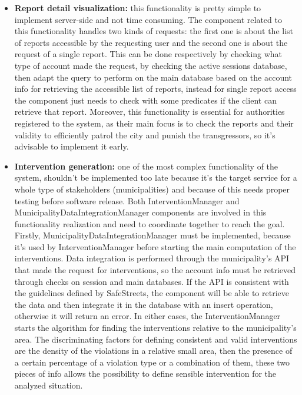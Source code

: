 \begin{itemize}
	\item \textbf{Report detail visualization:} this functionality is pretty simple to implement server-side and not time consuming. The component related to this functionality handles two kinds of requests: the first one is about the list of reports accessible by the requesting user and the second one is about the request of a single report. This can be done respectively by checking what type of account made the request, by checking the active sessions database, then adapt the query to perform on the main database based on the account info for retrieving the accessible list of reports, instead for single report access the component just needs to check with some predicates if the client can retrieve that report. Moreover, this functionality is essential for authorities registered to the system, as their main focus is to check the reports and their validity to efficiently patrol the city and punish the transgressors, so it's advisable to implement it early.
	
	\item \textbf{Intervention generation:} one of the most complex functionality of the system, shouldn't be implemented too late because it's the target service for a whole type of stakeholders (municipalities) and because of this needs proper testing before software release. Both InterventionManager and MunicipalityDataIntegrationManager components are involved in this functionality realization and need to coordinate together to reach the goal. Firstly, MunicipalityDataIntegrationManager must be implemented, because it's used by InterventionManager before starting the main computation of the interventions. Data integration is performed through the municipality's API that made the request for interventions, so the account info must be retrieved through checks on session and main databases. If the API is consistent with the guidelines defined by SafeStreets, the component will be able to retrieve the data and then integrate it in the database with an insert operation, otherwise it will return an error. In either cases, the InterventionManager starts the algorithm for finding the interventions relative to the municipality's area. The discriminating factors for defining consistent and valid interventions are the density of the violations in a relative small area, then the presence of a certain percentage of a violation type or a combination of them, these two pieces of info allows the possibility to define sensible intervention for the analyzed situation.
	

\end{itemize}

